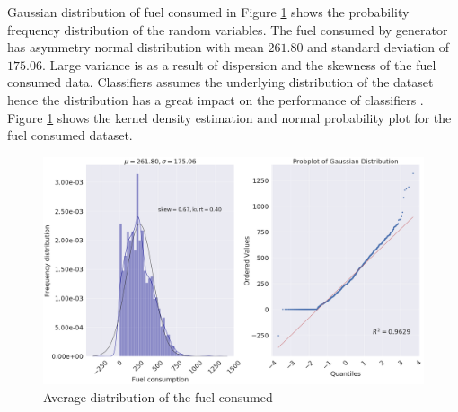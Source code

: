 \documentclass[final,5p,times,twocolumn,authoryear]{elsarticle}
\begin{document}
Gaussian distribution of fuel consumed in Figure \ref{fig:probitplot} shows the probability frequency distribution of the random variables. The fuel consumed by generator has asymmetry normal distribution with mean $261.80$ and standard deviation of $175.06$. Large variance is as a result of dispersion and the skewness of the fuel consumed data. Classifiers assumes the underlying distribution of the dataset hence the distribution has a great impact on the performance of classifiers \cite{japkowicz2011evaluating}. 
Figure \ref{fig:probitplot} shows the kernel density estimation and normal probability plot for the fuel consumed dataset. 
\begin{figure}[H]
	\centering
	\includegraphics[width=1.0\linewidth]{Figures/probitPlot}
	\caption{Average distribution of the fuel consumed}
	\label{fig:probitplot}
\end{figure}

%
   
\end{document}
